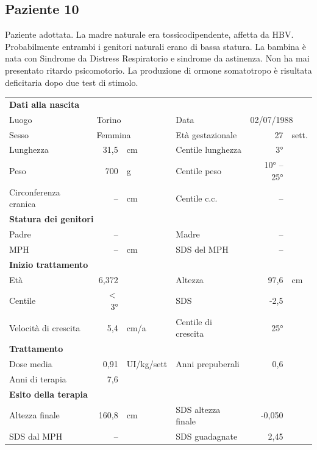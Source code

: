 \subsection*{Paziente 10}%

Paziente adottata. La madre naturale era tossicodipendente, affetta da HBV. Probabilmente entrambi i genitori naturali erano di bassa statura. La bambina è nata con Sindrome da Distress Respiratorio e sindrome da astinenza. Non ha mai presentato ritardo psicomotorio. La produzione di ormone somatotropo è risultata deficitaria dopo due test di stimolo.

\begin{table}[!h]
\begin{tabular}{lrllrl}
\toprule
\multicolumn{6}{l}{\textbf{Dati alla nascita}}\\
Luogo 		& \multicolumn{2}{l}{Torino} 	& Data 					& \multicolumn{2}{l}{02/07/1988} 	\\
Sesso 		& \multicolumn{2}{l}{Femmina} 	& Età gestazionale 		& 27 		& sett.\\
Lunghezza 	& 31,5 		& cm 				& Centile lunghezza		& 3° 		\\
Peso 		& 700 		& g					& Centile peso			& 10° -- 25° \\
Circonferenza cranica	& -- 		& cm 	& Centile c.c.			& -- \\
\midrule
\multicolumn{6}{l}{\textbf{Statura dei genitori}}\\
Padre 		& -- &  	& Madre 				& -- &  \\
MPH 		& -- & cm 	& SDS del MPH 			& --\\
\midrule
\multicolumn{6}{l}{\textbf{Inizio trattamento}} \\
Età	& 6,372 & 		& Altezza 				& 97,6 & cm  \\
Centile & $<$ 3° 	 &		& SDS		& -2,5 \\
Velocità di crescita & 5,4 & cm/a	& Centile di crescita & 25°\\
\midrule
\multicolumn{6}{l}{\textbf{Trattamento}} \\
Dose media		& 0,91 & UI/kg/sett & Anni prepuberali & 0,6\\
Anni di terapia & 7,6\\
\midrule
\multicolumn{6}{l}{\textbf{Esito della terapia}} \\
Altezza finale			& 160,8 & cm 	& SDS altezza finale		& -0,050\\
SDS dal MPH				& -- &		& SDS guadagnate 			& 2,45\\
\bottomrule
\end{tabular}
\end{table}
\clearpage


